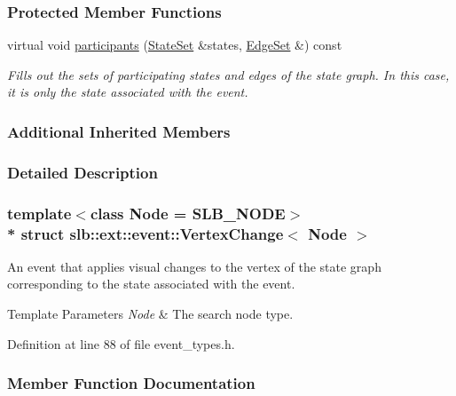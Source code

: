 \subsubsection*{Protected Member Functions}
\begin{DoxyCompactItemize}
\item 
virtual void \hyperlink{structslb_1_1ext_1_1event_1_1VertexChange_a943c86d31bae8b618b862021275f2d95}{participants} (\hyperlink{structslb_1_1ext_1_1event_1_1UniformChange_a2c45514041ea86f77bbd0147fe06babd}{State\+Set} \&states, \hyperlink{structslb_1_1ext_1_1event_1_1UniformChange_af17825d303d567061f2d510f231d556c}{Edge\+Set} \&) const 
\begin{DoxyCompactList}\small\item\em Fills out the sets of participating states and edges of the state graph. In this case, it is only the state associated with the event. \end{DoxyCompactList}\end{DoxyCompactItemize}
\subsubsection*{Additional Inherited Members}


\subsubsection{Detailed Description}
\subsubsection*{template$<$class Node = S\+L\+B\+\_\+\+N\+O\+DE$>$\\*
struct slb\+::ext\+::event\+::\+Vertex\+Change$<$ Node $>$}

An event that applies visual changes to the vertex of the state graph corresponding to the state associated with the event. 


\begin{DoxyTemplParams}{Template Parameters}
{\em Node} & The search node type. \\
\hline
\end{DoxyTemplParams}


Definition at line 88 of file event\+\_\+types.\+h.



\subsubsection{Member Function Documentation}
